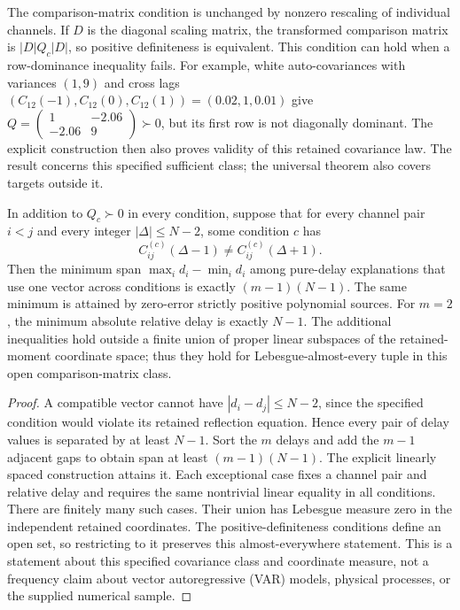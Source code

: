 The comparison-matrix condition is unchanged by nonzero rescaling of individual channels. If $D$ is the diagonal scaling matrix, the transformed comparison matrix is $|D|Q_c|D|$, so positive definiteness is equivalent. This condition can hold when a row-dominance inequality fails. For example, white auto-covariances with variances $(1,9)$ and cross lags $(C_{12}(-1),C_{12}(0),C_{12}(1))=(0.02,1,0.01)$ give $Q=\left(\begin{smallmatrix}1&-2.06\\-2.06&9\end{smallmatrix}\right)\succ0$, but its first row is not diagonally dominant. The explicit construction then also proves validity of this retained covariance law. The result concerns this specified sufficient class; the universal theorem also covers targets outside it.


\begin{corollary}\label{cor:generic-span}
In addition to $Q_c\succ0$ in every condition, suppose that for
 every channel pair $i<j$ and every integer $|\Delta|\le N-2$, some
condition $c$ has
\[
 C^{(c)}_{ij}(\Delta-1)\ne C^{(c)}_{ij}(\Delta+1).
\]
Then the minimum span $\max_i d_i-\min_i d_i$ among pure-delay explanations that use one vector across conditions is exactly $(m-1)(N-1)$. The same minimum is attained by
zero-error strictly positive polynomial sources. For $m=2$, the minimum
absolute relative delay is exactly $N-1$.
The additional inequalities hold outside a finite union of proper
linear subspaces of the retained-moment coordinate space; thus they
hold for Lebesgue-almost-every tuple in this open comparison-matrix class.
\end{corollary}
\begin{proof}
A compatible vector cannot have $|d_i-d_j|\le N-2$, since the specified
condition would violate its retained reflection equation. Hence every
pair of delay values is separated by at least $N-1$. Sort the $m$
delays and add the $m-1$ adjacent gaps to obtain span at least
$(m-1)(N-1)$. The explicit linearly spaced construction attains it.
Each exceptional case fixes a channel pair and relative delay and
requires the same nontrivial linear equality in all conditions. There
are finitely many such cases. Their union has Lebesgue measure zero in
the independent retained coordinates. The positive-definiteness conditions define
an open set, so restricting to it preserves this almost-everywhere
statement. This is a statement about this specified covariance class
and coordinate measure, not a frequency claim about vector autoregressive (VAR) models,
physical processes, or the supplied numerical sample.
\end{proof}
